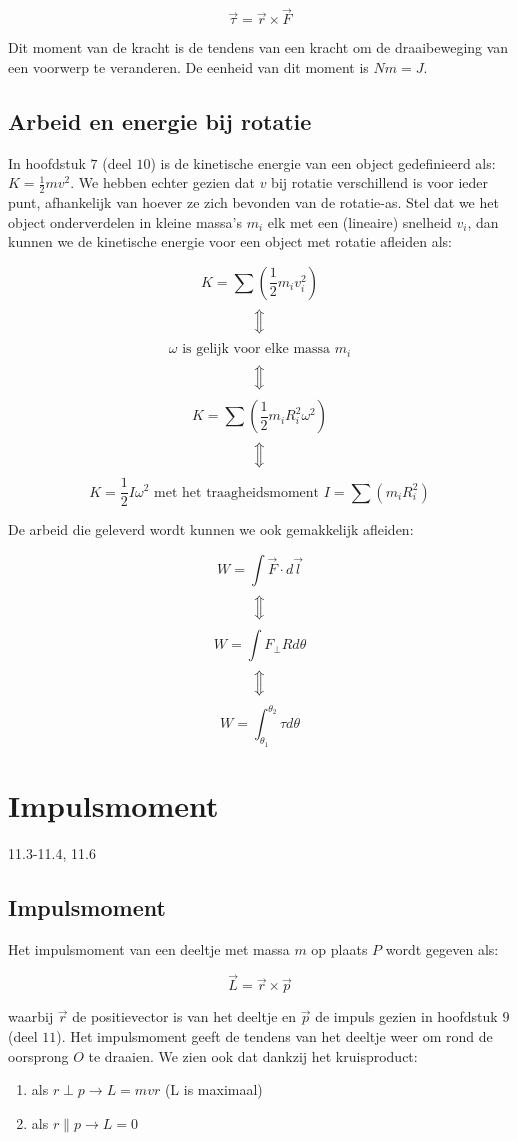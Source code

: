 \documentclass[12pt,a4paper]{article}
\newcommand{\Luda}{\Big\Updownarrow}
\begin{document}
    $$\vec{\tau} = \vec{r} \times \vec{F}$$
    
    Dit moment van de kracht is de tendens van een kracht om de draaibeweging van een voorwerp
    te veranderen.  De eenheid van dit moment is $Nm = J$. 
    
    \subsection{Arbeid en energie bij rotatie}
    In hoofdstuk $7$ (deel $10$) is de kinetische energie van een object gedefinieerd als: $K = \frac{1}{2}mv^{2}$. We
    hebben echter gezien dat $v$ bij rotatie verschillend is voor ieder punt, afhankelijk van hoever ze zich bevonden van
    de rotatie-as. Stel dat we het object onderverdelen in kleine massa's $m_i$ elk met een (lineaire) snelheid $v_i$, dan kunnen
    we de kinetische energie voor een object met rotatie afleiden als:
    
    $$K = \sum \left( \frac{1}{2} m_{i} v_{i}^{2}\right)$$
    $$\Luda$$
    $$\omega \textrm{ is gelijk voor elke massa } m_{i}$$
    $$\Luda$$
    $$K = \sum \left( \frac{1}{2} m_{i} R_{i}^{2}\omega^{2}\right)$$
    $$\Luda$$
    $$K = \frac{1}{2} I\omega^{2} \textrm{ met het traagheidsmoment } I = \sum \left(m_{i} R_{i}^{2}\right)$$
    
    De arbeid die geleverd wordt kunnen we ook gemakkelijk afleiden:
    
    $$W = \int \vec{F} \cdot d\vec{l}$$
    $$\Luda$$
    $$W = \int F_{\perp}Rd\theta$$
    $$\Luda$$
    $$W = \int_{\theta_{1}}^{\theta_{2}} \tau d\theta$$

    \section{Impulsmoment}
    11.3-11.4, 11.6
    \subsection{Impulsmoment}
    Het impulsmoment van een deeltje met massa $m$ op plaats $P$ wordt gegeven als:
    
    $$\vec{L} = \vec{r} \times \vec{p}$$
    
    waarbij $\vec{r}$ de positievector is van het deeltje en $\vec{p}$ de impuls gezien in hoofdstuk $9$ (deel $11$).
    Het impulsmoment geeft de tendens van het deeltje weer om rond de oorsprong $O$ te draaien. We zien ook dat dankzij
    het kruisproduct:
    
    \begin{enumerate}
    	\item als $r \perp p \to L = mvr$ (L is maximaal)
    	\item als $r \parallel p \to L = 0$
   \end{enumerate}
   
\end{document}
